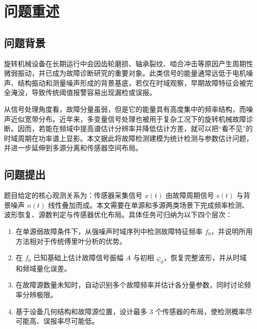 \documentclass[withoutpreface,bwprint]{cumcmthesis}
\begin{document}
\setcounter{page}{1}
\pagestyle{plain}
\setlength{\cftsecnumwidth}{3.5em}
\tableofcontents
\clearpage

\begingroup
{}
\renewcommand{\cftfigpresnum}{图}
\setlength{\cftfignumwidth}{3em}
\renewcommand{\cfttabpresnum}{表}
\setlength{\cfttabnumwidth}{3em}
\listoffigures
\vspace{1em}
\listoftables
\endgroup
\clearpage

\setcounter{page}{1}
\pagestyle{plain}
\section{问题重述}

\subsection{问题背景}

旋转机械设备在长期运行中会因齿轮磨损、轴承裂纹、啮合冲击等原因产生周期性微弱振动，并已成为故障诊断研究的重要对象\cite{lv2022}。此类信号的能量通常远低于电机噪声、结构振动和测量噪声形成的背景基底，若仅在时域观察，早期故障特征会被完全淹没，导致传统阈值报警容易出现漏检或误报。

从信号处理角度看，故障分量虽弱，但是它的能量具有高度集中的频率结构，而噪声近似宽带分布。近年来，多变量信号处理也被用于复杂工况下的旋转机械故障诊断\cite{lv2022}。因而，若能在频域中提高谱估计分辨率并降低估计方差，就可以把“看不见”的时域周期在功率谱上显影。本文据此将故障检测建模为统计检测与参数估计问题，并进一步延伸到多源分离和传感器空间布局。

\subsection{问题提出}

题目给定的核心观测关系为：传感器采集信号 \(x(t)\) 由故障周期信号 \(s(t)\) 与背景噪声 \(n(t)\) 线性叠加而成。本文需要在单源和多源两类场景下完成频率检测、波形恢复、源数判定与传感器优化布局。具体任务可归纳为以下四个层次：

\begin{enumerate}[label=问题\arabic*：,leftmargin=4em]
    \item 在单源弱故障条件下，从强噪声时域序列中检测故障特征频率 \(f_0\)，并说明所用方法相对于传统傅里叶分析的优势。
    \item 在 \(f_0\) 已知基础上估计故障信号振幅 \(A\) 与初相 \(\varphi_0\)，恢复完整波形，并从时域和频域量化误差。
    \item 在故障源数量未知时，自动识别多个故障频率并估计各分量参数，同时讨论频率分辨极限。
    \item 基于设备几何结构和故障源位置，设计最多 \(3\) 个传感器的布局，使检测概率尽可能高、误报率尽可能低。
\end{enumerate}
\end{document}
